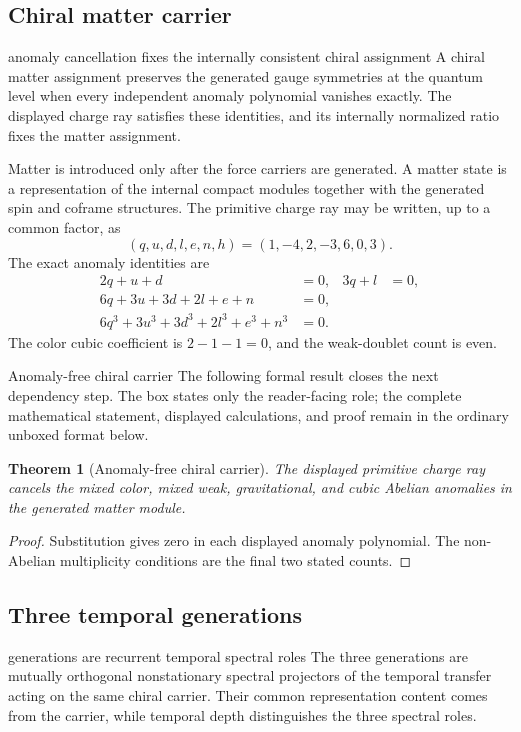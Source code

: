 \documentclass[11pt]{article}
\numberwithin{equation}{section}
\newtheorem{theorem}[definition]{Theorem}
\theoremstyle{remark}
\begin{document}
\label{sec:matter}

\subsection{Chiral matter carrier}
\begin{interpretivebridge}{anomaly cancellation fixes the internally consistent chiral assignment}
A chiral matter assignment preserves the generated gauge symmetries at the quantum level when every independent anomaly polynomial vanishes exactly. The displayed charge ray satisfies these identities, and its internally normalized ratio fixes the matter assignment.
\end{interpretivebridge}

Matter is introduced only after the force carriers are generated. A matter state is a representation of the internal compact modules together with the generated spin and coframe structures. The primitive charge ray may be written, up to a common factor, as
\begin{equation}
(q,u,d,l,e,n,h)=(1,-4,2,-3,6,0,3).
\end{equation}
The exact anomaly identities are
\begin{align}
2q+u+d&=0,&3q+l&=0,\\
6q+3u+3d+2l+e+n&=0,\\
6q^3+3u^3+3d^3+2l^3+e^3+n^3&=0.
\end{align}
The color cubic coefficient is $2-1-1=0$, and the weak-doublet count is even.

\begin{proofguide}{Anomaly-free chiral carrier}
The following formal result closes the next dependency step. The box states only the reader-facing role; the complete mathematical statement, displayed calculations, and proof remain in the ordinary unboxed format below.
\end{proofguide}
\begin{theorem}[Anomaly-free chiral carrier]
The displayed primitive charge ray cancels the mixed color, mixed weak, gravitational, and cubic Abelian anomalies in the generated matter module.
\end{theorem}
\begin{proof}
Substitution gives zero in each displayed anomaly polynomial. The non-Abelian multiplicity conditions are the final two stated counts.
\end{proof}

\subsection{Three temporal generations}
\begin{interpretivebridge}{generations are recurrent temporal spectral roles}
The three generations are mutually orthogonal nonstationary spectral projectors of the temporal transfer acting on the same chiral carrier. Their common representation content comes from the carrier, while temporal depth distinguishes the three spectral roles.
\end{interpretivebridge}
\end{document}
